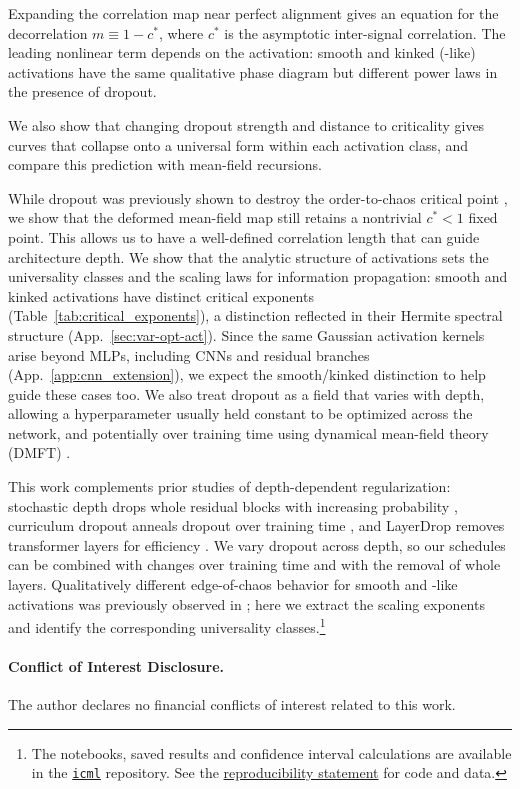 Expanding the correlation map near perfect alignment gives an equation for the decorrelation $m \equiv 1-c^\ast$, where $c^\ast$ is the asymptotic inter-signal correlation. The leading nonlinear term depends on the activation: smooth and kinked (\relu{}-like) activations have the same qualitative phase diagram but different power laws in the presence of dropout.

We also show that changing dropout strength and distance to criticality gives curves that collapse onto a universal form within each activation class, and compare this prediction with mean-field recursions.

While dropout was previously shown to destroy the order-to-chaos critical point \cite{schoenholz2017deepinformationpropagation}, we show that the deformed mean-field map still retains a nontrivial $c^\ast<1$ fixed point. This allows us to have a well-defined correlation length that can guide architecture depth. We show that the analytic structure of activations sets the universality classes and the scaling laws for information propagation: smooth and kinked activations have distinct critical exponents (Table~\ref{tab:critical_exponents}), a distinction reflected in their Hermite spectral structure (App.~\ref{sec:var-opt-act}). Since the same Gaussian activation kernels arise beyond MLPs, including CNNs and residual branches (App.~\ref{app:cnn_extension}), we expect the smooth/kinked distinction to help guide these cases too. We also treat dropout as a field that varies with depth, allowing a hyperparameter usually held constant to be optimized across the network, and potentially over training time using dynamical mean-field theory (DMFT) \cite{bordelon2022selfconsistent}.

This work complements prior studies of depth-dependent regularization: stochastic depth drops whole residual blocks with increasing probability \cite{huang2016deep}, curriculum dropout anneals dropout over training time \cite{morerio2017curriculum}, and LayerDrop removes transformer layers for efficiency \cite{fan2019reducing}. We vary dropout across depth, so our schedules can be combined with changes over training time and with the removal of whole layers. Qualitatively different edge-of-chaos behavior for smooth and \relu{}-like activations was previously observed in \cite{hayou2019impact}; here we extract the scaling exponents and identify the corresponding universality classes.\footnote{The notebooks, saved results and confidence interval calculations are available in the \href{https://github.com/luklacasito/icml}{\texttt{icml}} repository. See the \hyperref[sec:reproducibility]{reproducibility statement} for code and data.}

\paragraph{Conflict of Interest Disclosure.}
The author declares no financial conflicts of interest related to this work.

